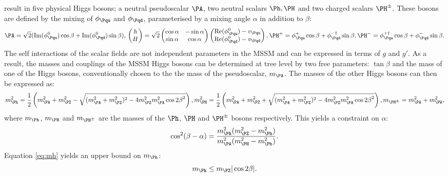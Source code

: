 result in five physical Higgs bosons; a neutral pseudoscalar $\PA$, two neutral
scalars $\Ph,\PH$ and two charged scalars $\PH^{\pm}$. These bosons are defined
by the mixing of $\phi_{\Pqu}$ and $\phi_{\Pqd}$, parameterised by a mixing
angle $\alpha$ in addition to $\beta$:
\begin{equation}
\PA = \sqrt{2}(\text{Im}(\phi_{\Pqu}^{0})\cos\beta +
\text{Im}(\phi_{\Pqd}^{0})\sin\beta), \\ 
\begin{pmatrix} h \\ H \end{pmatrix} = \sqrt{2} 
\begin{pmatrix} \cos\alpha & -\sin\alpha \\ \sin\alpha & \cos\alpha \end{pmatrix}
\begin{pmatrix} \text{Re}(\phi_{\Pqu}^{0}) - v_{\Pqu} \\ \text{Re}(\phi_{\Pqd}^{0}) -
v_{\Pqd}\end{pmatrix}, \\
\PH^{+} = \phi_{\Pqu}^{+} \cos \beta + \phi_{\Pqd}^{-\dagger} \sin \beta,\\
\PH^{-} = \phi_{\Pqu}^{+\dagger} \cos \beta + \phi_{\Pqd}^{-} \sin \beta.
\end{equation}
The self interactions of the scalar fields are not independent parameters in the
\ac{MSSM} and can be expressed in terms of $g$ and $g'$. As a result, the masses
and couplings of the \ac{MSSM} Higgs bosons can be determined at tree level by
two free parameters: $\tan\beta$ and the mass of one of the Higgs bosons,
conventionally chosen to the the mass of the pseudoscalar, $m_{\PA}$. The masses
of the other Higgs bosons can then be expressed as:
\begin{equation}
m_{\Ph}^{2} = \frac{1}{2} \left( m_{\PA}^{2} + m_{\PZ}^{2} - \sqrt{(m_{\PA}^{2} +
m_{\PZ}^{2})^{2} - 4m_{\PZ}^{2}m_{\PA}^{2}\cos{2\beta}^{2} }\right) ,
\label{eq:mh}\\
m_{\PH}^{2} = \frac{1}{2} \left( m_{\PA}^{2} + m_{\PZ}^{2} + \sqrt{(m_{\PA}^{2} +
m_{\PZ}^{2})^{2} - 4m_{\PZ}^{2}m_{\PA}^{2}\cos{2\beta}^{2} }\right) , \\
m_{\PH^{\pm}} = m_{\PA}^{2} + m_{\PW}^{2},
\end{equation}
where $m_{\Ph}$, $m_{\PH}$ and $m_{\PH^{\pm}}$ are the masses of the $\Ph$,
$\PH$ and $\PH^{\pm}$ bosons respectively. This yields a constraint on $\alpha$:
\begin{equation}
\cos^{2}(\beta-\alpha) = \frac{m_{\Ph}^{2}(m_{\PZ}^{2} -
m_{\Ph}^{2})}{m_{\PA}^{2}(m_{\PH}^{2} - m_{\Ph}^{2}) }.
\end{equation}
Equation \ref{eq:mh} yields an upper bound on $m_{\Ph}$:
\begin{equation}
m_{\Ph} \leq m_{\PZ} |\cos{2\beta}|. 
\end{equation}

